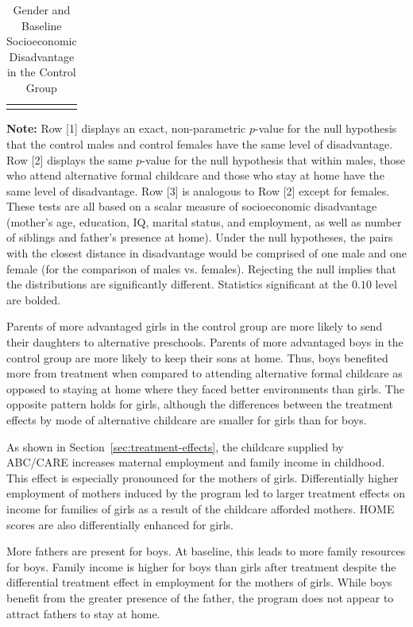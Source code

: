 \begin{table}[!htpb]
\begin{threeparttable}
\caption{Gender and Baseline Socioeconomic Disadvantage in the Control Group} \label{table:disadtests}
\centering
\begin{tabularx}{16.5cm}{XcX}
&  &
\end{tabularx}
\begin{tablenotes}
\footnotesize
\item \textbf{Note:} Row [1] displays an exact, non-parametric $p$-value for the null hypothesis that the control males and control females have the same level of disadvantage. Row [2] displays the same $p$-value for the null  hypothesis that within males, those who attend alternative formal childcare and those who stay at home have the same level of disadvantage. Row [3] is analogous to Row [2] except for females. These tests are all based on a scalar measure of socioeconomic disadvantage (mother's age, education, IQ, marital status, and employment, as well as number of siblings and father's presence at home). Under the null hypotheses, the pairs with the closest distance in disadvantage would be comprised of one male and one female (for the comparison of males vs. females). Rejecting the null implies that the distributions are significantly different. Statistics significant at the $0.10$ level are bolded.
\end{tablenotes}
\end{threeparttable}
\end{table}

Parents of more advantaged girls in the control group are more likely to send their daughters to alternative preschools. Parents of more advantaged boys in the control group are more likely to keep their sons at home. Thus, boys benefited more from treatment when compared to attending alternative formal childcare as opposed to staying at home where they faced better environments than girls. The opposite pattern holds for girls, although the differences between the treatment effects by mode of alternative childcare are smaller for girls than for boys.

As shown in Section~\ref{sec:treatment-effects}, the childcare supplied by ABC/CARE increases maternal employment and family income in childhood. This effect is especially pronounced for the mothers of girls. Differentially higher employment of mothers induced by the program led to larger treatment effects on income for families of girls as a result of the childcare afforded mothers. HOME scores are also differentially enhanced for girls.

More fathers are present for boys. At baseline, this leads to more family resources for boys. Family income is higher for boys than girls after treatment despite the differential treatment effect in employment for the mothers of girls. While boys benefit from the greater presence of the father, the program does not appear to attract fathers to stay at home.


